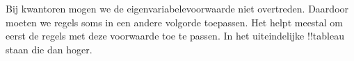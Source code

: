 \documentclass[openany]{memoir}
\begin{document}
\begingroup
\def\olfilename{OLP-0104}
\def\olfilepath{content/first-order-logic/tableaux/}
\hypertarget{unit-OLP-0104}{}





\begin{ex}
Bij kwantoren mogen we de eigenvariabelevoorwaarde niet overtreden.
Daardoor moeten we regels soms in een andere volgorde toepassen. Het
helpt meestal om eerst de regels met deze voorwaarde toe te passen. In
het uiteindelijke !!{tableau} staan die dan hoger.


\end{ex}
\end{document}
